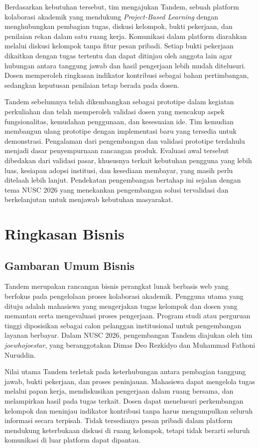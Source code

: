 \documentclass[12pt,a4paper,oneside]{report}
\begin{document}
Berdasarkan kebutuhan tersebut, tim mengajukan Tandem, sebuah platform kolaborasi akademik yang mendukung \textit{Project-Based Learning} dengan menghubungkan pembagian tugas, diskusi kelompok, bukti pekerjaan, dan penilaian rekan dalam satu ruang kerja. Komunikasi dalam platform diarahkan melalui diskusi kelompok tanpa fitur pesan pribadi. Setiap bukti pekerjaan dikaitkan dengan tugas tertentu dan dapat ditinjau oleh anggota lain agar hubungan antara tanggung jawab dan hasil pengerjaan lebih mudah ditelusuri. Dosen memperoleh ringkasan indikator kontribusi sebagai bahan pertimbangan, sedangkan keputusan penilaian tetap berada pada dosen.

Tandem sebelumnya telah dikembangkan sebagai prototipe dalam kegiatan perkuliahan dan telah memperoleh validasi dosen yang mencakup aspek fungsionalitas, kemudahan penggunaan, dan kesesuaian ide. Tim kemudian membangun ulang prototipe dengan implementasi baru yang tersedia untuk demonstrasi. Pengalaman dari pengembangan dan validasi prototipe terdahulu menjadi dasar penyempurnaan rancangan produk. Evaluasi awal tersebut dibedakan dari validasi pasar, khususnya terkait kebutuhan pengguna yang lebih luas, kesiapan adopsi institusi, dan kesediaan membayar, yang masih perlu ditelaah lebih lanjut. Pendekatan pengembangan bertahap ini sejalan dengan tema NUSC 2026 yang menekankan pengembangan solusi tervalidasi dan berkelanjutan untuk menjawab kebutuhan masyarakat.

\section{Ringkasan Bisnis}
\subsection{Gambaran Umum Bisnis}
Tandem merupakan rancangan bisnis perangkat lunak berbasis web yang berfokus pada pengelolaan proses kolaborasi akademik. Pengguna utama yang dituju adalah mahasiswa yang mengerjakan tugas kelompok dan dosen yang memantau serta mengevaluasi proses pengerjaan. Program studi atau perguruan tinggi diposisikan sebagai calon pelanggan institusional untuk pengembangan layanan berbayar. Dalam NUSC 2026, pengembangan Tandem diajukan oleh tim \textit{joewhojoestar}, yang beranggotakan Dimas Deo Rezkidyo dan Muhammad Fathoni Nuruddin.

Nilai utama Tandem terletak pada keterhubungan antara pembagian tanggung jawab, bukti pekerjaan, dan proses peninjauan. Mahasiswa dapat mengelola tugas melalui papan kerja, mendiskusikan pengerjaan dalam ruang bersama, dan melampirkan hasil pada tugas terkait. Dosen dapat menelusuri perkembangan kelompok dan meninjau indikator kontribusi tanpa harus mengumpulkan seluruh informasi secara terpisah. Tidak tersedianya pesan pribadi dalam platform mendukung keterbukaan diskusi di ruang kelompok, tetapi tidak berarti seluruh komunikasi di luar platform dapat dipantau.
\end{document}
